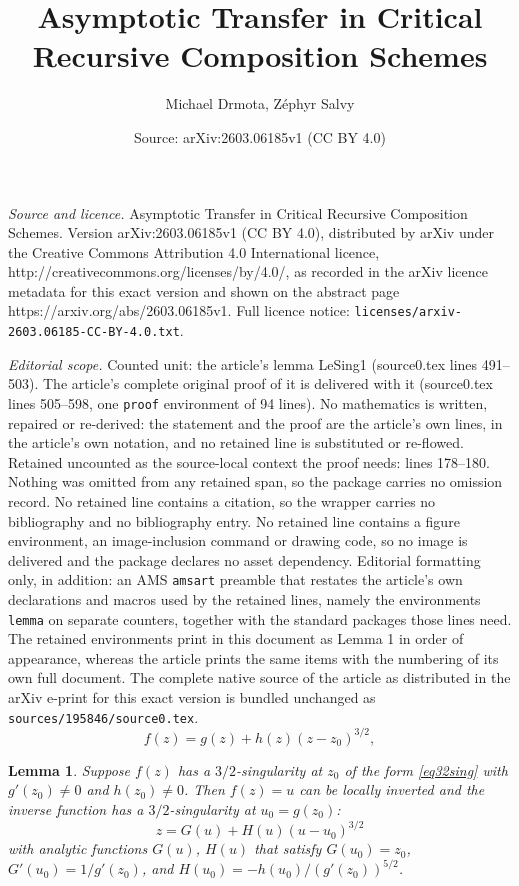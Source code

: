 \documentclass[10pt,a4paper]{amsart}
\title{Asymptotic Transfer in Critical Recursive Composition Schemes}
\author{Michael Drmota, Z\'ephyr Salvy}
\date{Source: arXiv:2603.06185v1 (CC BY 4.0)}
\newtheorem{lemma}{Lemma}
\begin{document}
\maketitle

\noindent\emph{Source and licence.} Asymptotic Transfer in Critical Recursive Composition Schemes. Version arXiv:2603.06185v1 (CC BY 4.0), distributed by arXiv under the Creative Commons Attribution 4.0 International licence, http://creativecommons.org/licenses/by/4.0/, as recorded in the arXiv licence metadata for this exact version and shown on the abstract page https://arxiv.org/abs/2603.06185v1. Full licence notice: \texttt{licenses/arxiv-2603.06185-CC-BY-4.0.txt}.\par\smallskip

\noindent\textit{Editorial scope.} Counted unit: the article's lemma LeSing1 (source0.tex lines 491--503). The article's complete original proof of it is delivered with it (source0.tex lines 505--598, one \texttt{proof} environment of 94 lines). No mathematics is written, repaired or re-derived: the statement and the proof are the article's own lines, in the article's own notation, and no retained line is substituted or re-flowed.  Retained uncounted as the source-local context the proof needs: lines 178--180.  Nothing was omitted from any retained span, so the package carries no omission record.  No retained line contains a citation, so the wrapper carries no bibliography and no bibliography entry.  No retained line contains a figure environment, an image-inclusion command or drawing code, so no image is delivered and the package declares no asset dependency.  Editorial formatting only, in addition: an AMS \texttt{amsart} preamble that restates the article's own declarations and macros used by the retained lines, namely the environments \texttt{lemma} on separate counters, together with the standard packages those lines need.  The retained environments print in this document as Lemma 1 in order of appearance, whereas the article prints the same items with the numbering of its own full document.  The complete native source of the article as distributed in the arXiv e-print for this exact version is bundled unchanged as \texttt{sources/195846/source0.tex}.
\begin{equation}\label{eq32sing}
    f(z) = g(z) + h(z) (z-z_0)^{3/2},
\end{equation}

\begin{lemma}\label{LeSing1}
    Suppose $f(z)$ has a $3/2$-singularity at $z_0$ of the form 
    \cref{eq32sing} with $g'(z_0)\ne 0$ and $h(z_0) \ne 0$.
    Then $f(z)=u$ can be locally
    inverted and the inverse function has 
    a $3/2$-singularity at $u_0 = g(z_0)$:
    \begin{equation}\label{eqLeSing1}
    z = G(u) + H(u) (u-u_0)^{3/2}
    \end{equation}
    with analytic functions $G(u)$, $H(u)$ that satisfy
    $G(u_0) = z_0$, $G'(u_0) = 1/g'(z_0)$, and 
    $H(u_0) = - h(u_0)/(g'(z_0))^{5/2}$.
\end{lemma}
\end{document}

